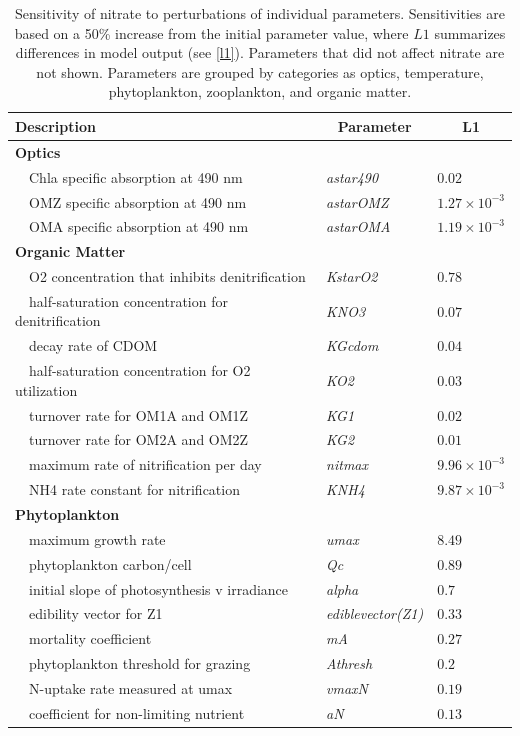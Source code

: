 \documentclass[review]{elsarticle}\usepackage[]{graphicx}\usepackage[]{color}
\begin{document}
\begin{table}[!tbp]
{\footnotesize
\caption{Sensitivity of nitrate to perturbations of individual parameters.  Sensitivities are based on a 50\% increase from the initial parameter value, where $L1$ summarizes differences in model output (see \cref{l1}).  Parameters that did not affect nitrate are not shown.  Parameters are grouped by categories as optics, temperature, phytoplankton, zooplankton, and organic matter.\label{tab:no3sens}} 
\begin{center}
\begin{tabular}{lll}
\hline\hline
\multicolumn{1}{l}{Description}&\multicolumn{1}{c}{Parameter}&\multicolumn{1}{c}{L1}\tabularnewline
\hline
{\bfseries Optics}&&\tabularnewline
~~Chla specific absorption at 490 nm&\textit{astar490}&$0.02$\tabularnewline
~~OMZ specific absorption at 490 nm&\textit{astarOMZ}&$1.27\times 10^{-3}$\tabularnewline
~~OMA specific absorption at 490 nm&\textit{astarOMA}&$1.19\times 10^{-3}$\tabularnewline
\hline
{\bfseries Organic Matter}&&\tabularnewline
~~O2 concentration that inhibits denitrification&\textit{KstarO2}&$0.78$\tabularnewline
~~half-saturation concentration for denitrification&\textit{KNO3}&$0.07$\tabularnewline
~~decay rate of CDOM&\textit{KGcdom}&$0.04$\tabularnewline
~~half-saturation concentration for O2 utilization&\textit{KO2}&$0.03$\tabularnewline
~~turnover rate for OM1A and OM1Z&\textit{KG1}&$0.02$\tabularnewline
~~turnover rate for OM2A and OM2Z&\textit{KG2}&$0.01$\tabularnewline
~~maximum rate of nitrification per day&\textit{nitmax}&$9.96\times 10^{-3}$\tabularnewline
~~NH4 rate constant for nitrification&\textit{KNH4}&$9.87\times 10^{-3}$\tabularnewline
\hline
{\bfseries Phytoplankton}&&\tabularnewline
~~maximum growth rate&\textit{umax}&$8.49$\tabularnewline
~~phytoplankton carbon/cell&\textit{Qc}&$0.89$\tabularnewline
~~initial slope of photosynthesis v irradiance&\textit{alpha}&$0.7$\tabularnewline
~~edibility vector for Z1&\textit{ediblevector(Z1)}&$0.33$\tabularnewline
~~mortality coefficient&\textit{mA}&$0.27$\tabularnewline
~~phytoplankton threshold for grazing&\textit{Athresh}&$0.2$\tabularnewline
~~N-uptake rate measured at umax&\textit{vmaxN}&$0.19$\tabularnewline
~~coefficient for non-limiting nutrient&\textit{aN}&$0.13$\tabularnewline

\end{tabular}
\end{center}}
\end{table}
\end{document}
